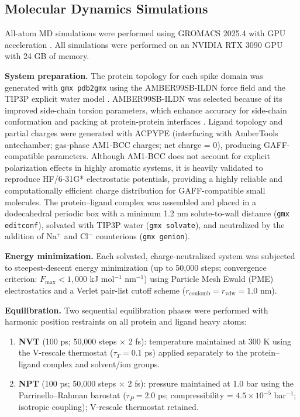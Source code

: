 \documentclass[pharmaceuticals,article,submit,pdftex,moreauthors]{Definitions/mdpi}
\begin{document}
\subsection{Molecular Dynamics Simulations}
All-atom MD simulations were performed using GROMACS 2025.4 with GPU acceleration \cite{abraham2015gromacs}. All simulations were performed on an NVIDIA RTX 3090 GPU with 24 GB of memory.

\textbf{System preparation.} The protein topology for each spike domain was generated with \texttt{gmx pdb2gmx} using the AMBER99SB-ILDN force field \cite{lindorff2010improved} and the TIP3P explicit water model \cite{jorgensen1983comparison}. AMBER99SB-ILDN was selected because of its improved side-chain torsion parameters, which enhance accuracy for side-chain conformation and packing at protein-protein interfaces \cite{lindorff2010improved, gkekas2024ai}. Ligand topology and partial charges were generated with ACPYPE \cite{sousa2012acpype} (interfacing with AmberTools \cite{case2023ambertools} antechamber; gas-phase AM1-BCC charges; net charge = 0), producing GAFF-compatible parameters. Although AM1-BCC does not account for explicit polarization effects in highly aromatic systems, it is heavily validated to reproduce HF/6-31G* electrostatic potentials, providing a highly reliable and computationally efficient charge distribution for GAFF-compatible small molecules. The protein--ligand complex was assembled and placed in a dodecahedral periodic box with a minimum 1.2 nm solute-to-wall distance (\texttt{gmx editconf}), solvated with TIP3P water (\texttt{gmx solvate}), and neutralized by the addition of Na$^+$ and Cl$^-$ counterions (\texttt{gmx genion}).

\textbf{Energy minimization.} Each solvated, charge-neutralized system was subjected to steepest-descent energy minimization (up to 50,000 steps; convergence criterion: $F_{\text{max}} < 1,000$ kJ mol$^{-1}$ nm$^{-1}$) using Particle Mesh Ewald (PME) electrostatics and a Verlet pair-list cutoff scheme ($r_{\text{coulomb}} = r_{\text{vdw}} = 1.0$ nm).

\textbf{Equilibration.} Two sequential equilibration phases were performed with harmonic position restraints on all protein and ligand heavy atoms:
\begin{enumerate}
    \item \textbf{NVT} (100 ps; 50,000 steps $\times$ 2 fs): temperature maintained at 300 K using the V-rescale thermostat ($\tau_T = 0.1$ ps) applied separately to the protein--ligand complex and solvent/ion groups.
    \item \textbf{NPT} (100 ps; 50,000 steps $\times$ 2 fs): pressure maintained at 1.0 bar using the Parrinello--Rahman barostat ($\tau_P = 2.0$ ps; compressibility = $4.5 \times 10^{-5}$ bar$^{-1}$; isotropic coupling); V-rescale thermostat retained.
\end{enumerate}
\end{document}
